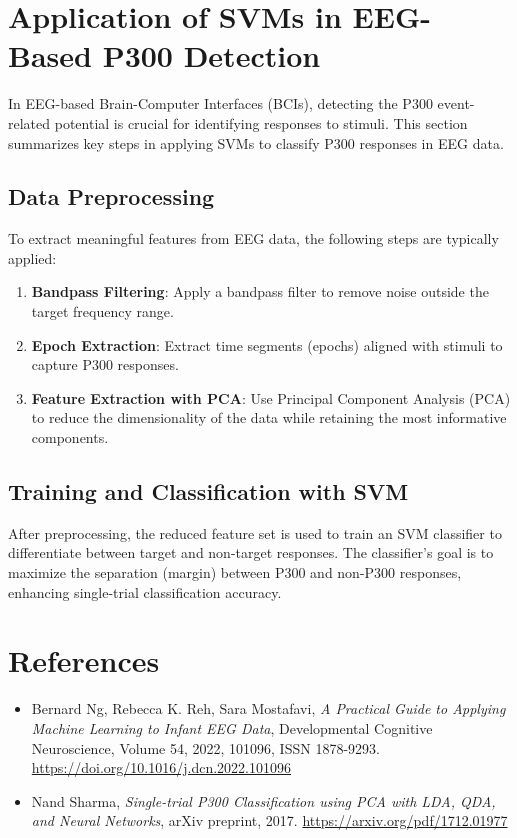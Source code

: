\documentclass{article}
\begin{document}
\section{Application of SVMs in EEG-Based P300 Detection}
In EEG-based Brain-Computer Interfaces (BCIs), detecting the P300 event-related potential is crucial for identifying responses to stimuli. This section summarizes key steps in applying SVMs to classify P300 responses in EEG data.

\subsection{Data Preprocessing}
To extract meaningful features from EEG data, the following steps are typically applied:
\begin{enumerate}
    \item \textbf{Bandpass Filtering}: Apply a bandpass filter to remove noise outside the target frequency range.
    \item \textbf{Epoch Extraction}: Extract time segments (epochs) aligned with stimuli to capture P300 responses.
    \item \textbf{Feature Extraction with PCA}: Use Principal Component Analysis (PCA) to reduce the dimensionality of the data while retaining the most informative components.
\end{enumerate}

\subsection{Training and Classification with SVM}
After preprocessing, the reduced feature set is used to train an SVM classifier to differentiate between target and non-target responses. The classifier’s goal is to maximize the separation (margin) between P300 and non-P300 responses, enhancing single-trial classification accuracy.

\section{References}
\begin{itemize}
    \item Bernard Ng, Rebecca K. Reh, Sara Mostafavi, \emph{A Practical Guide to Applying Machine Learning to Infant EEG Data}, Developmental Cognitive Neuroscience, Volume 54, 2022, 101096, ISSN 1878-9293. \href{https://doi.org/10.1016/j.dcn.2022.101096}{https://doi.org/10.1016/j.dcn.2022.101096}
    \item Nand Sharma, \emph{Single-trial P300 Classification using PCA with LDA, QDA, and Neural Networks}, arXiv preprint, 2017. \href{https://arxiv.org/pdf/1712.01977}{https://arxiv.org/pdf/1712.01977}
\end{itemize}
\end{document}
